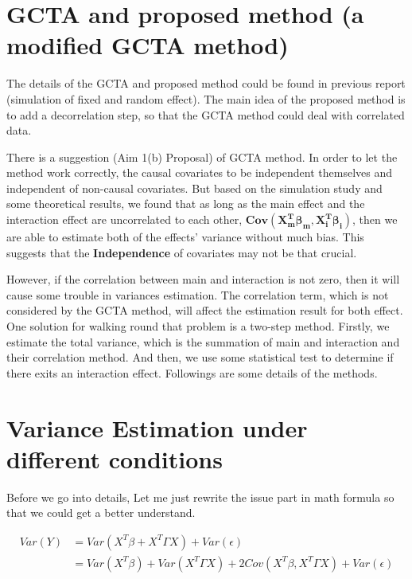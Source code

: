 \documentclass[]{article}
\begin{document}
\section{GCTA and proposed method (a modified GCTA
method)}\label{gcta-and-proposed-method-a-modified-gcta-method}

The details of the GCTA and proposed method could be found in previous
report (simulation of fixed and random effect). The main idea of the
proposed method is to add a decorrelation step, so that the GCTA method
could deal with correlated data.

There is a suggestion (Aim 1(b) Proposal) of GCTA method. In order to
let the method work correctly, the causal covariates to be independent
themselves and independent of non-causal covariates. But based on the
simulation study and some theoretical results, we found that as long as
the main effect and the interaction effect are uncorrelated to each
other, \(\mathbf{Cov(X_m^T\beta_{m}, X_i^T\beta_i)}\), then we are able
to estimate both of the effects' variance without much bias. This
suggests that the \textbf{Independence} of covariates may not be that
crucial.

However, if the correlation between main and interaction is not zero,
then it will cause some trouble in variances estimation. The correlation
term, which is not considered by the GCTA method, will affect the
estimation result for both effect. One solution for walking round that
problem is a two-step method. Firstly, we estimate the total variance,
which is the summation of main and interaction and their correlation
method. And then, we use some statistical test to determine if there
exits an interaction effect. Followings are some details of the methods.

\section{Variance Estimation under different
conditions}\label{variance-estimation-under-different-conditions}

Before we go into details, Let me just rewrite the issue part in math
formula so that we could get a better understand.

\begin{align*}
Var(Y) &= Var(X^T\beta + X^T\Gamma X) + Var(\epsilon) \\
         &= Var(X^T\beta) + Var(X^T\Gamma X) + 2Cov(X^T\beta, X^T\Gamma X) + Var(\epsilon) \\
\end{align*}
\end{document}
